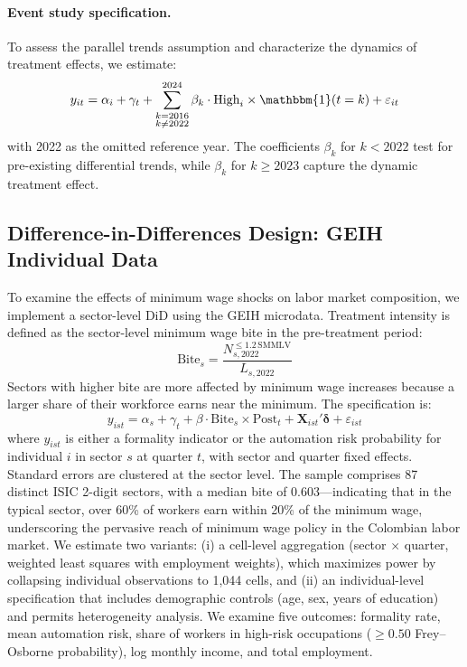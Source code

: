 \documentclass[5p,times,authoryear]{elsarticle}
\begin{document}
\paragraph{Event study specification.} To assess the parallel trends assumption and characterize the dynamics of treatment effects, we estimate:
\begin{equation}
\label{eq:event_study}
y_{it} = \alpha_i + \gamma_t + \sum_{\substack{k=2016 \\ k \neq 2022}}^{2024} \beta_k \cdot \text{High}_i \times \mathbbm{1}(t = k) + \varepsilon_{it}
\end{equation}
with 2022 as the omitted reference year. The coefficients $\beta_k$ for $k < 2022$ test for pre-existing differential trends, while $\beta_k$ for $k \geq 2023$ capture the dynamic treatment effect.

\subsection{Difference-in-Differences Design: GEIH Individual Data}
\label{subsec:did_geih}

To examine the effects of minimum wage shocks on labor market composition, we implement a sector-level DiD using the GEIH microdata. Treatment intensity is defined as the sector-level minimum wage bite in the pre-treatment period:
\begin{equation}
\label{eq:mw_bite}
\text{Bite}_s = \frac{N_{s,2022}^{\leq 1.2 \, \text{SMMLV}}}{L_{s,2022}}
\end{equation}
Sectors with higher bite are more affected by minimum wage increases because a larger share of their workforce earns near the minimum. The specification is:
\begin{equation}
\label{eq:did_geih}
y_{ist} = \alpha_s + \gamma_t + \beta \cdot \text{Bite}_s \times \text{Post}_t + \mathbf{X}_{ist}'\boldsymbol{\delta} + \varepsilon_{ist}
\end{equation}
where $y_{ist}$ is either a formality indicator or the automation risk probability for individual $i$ in sector $s$ at quarter $t$, with sector and quarter fixed effects. Standard errors are clustered at the sector level. The sample comprises 87 distinct ISIC 2-digit sectors, with a median bite of 0.603---indicating that in the typical sector, over 60\% of workers earn within 20\% of the minimum wage, underscoring the pervasive reach of minimum wage policy in the Colombian labor market. We estimate two variants: (i) a cell-level aggregation (sector $\times$ quarter, weighted least squares with employment weights), which maximizes power by collapsing individual observations to 1,044 cells, and (ii) an individual-level specification that includes demographic controls (age, sex, years of education) and permits heterogeneity analysis. We examine five outcomes: formality rate, mean automation risk, share of workers in high-risk occupations ($\geq 0.50$ Frey--Osborne probability), log monthly income, and total employment.
\end{document}
